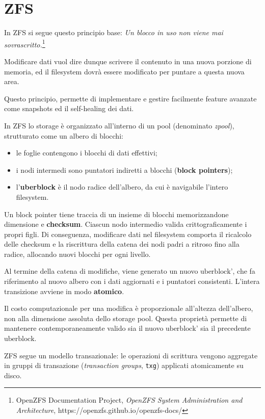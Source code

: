 \section{ZFS}\label{zfs}

In ZFS si segue questo principio base: \emph{Un blocco in uso non viene
mai sovrascritto.}\footnote{\label{fn:ref_29}OpenZFS Documentation Project, \emph{OpenZFS
  System Administration and Architecture},
  https://openzfs.github.io/openzfs-docs/}

Modificare dati vuol dire dunque scrivere il contenuto in una nuova
porzione di memoria, ed il filesystem dovrà essere modificato per
puntare a questa nuova area.

Questo principio, permette di implementare e gestire facilmente feature
avanzate come snapshots ed il self-healing dei dati.

In ZFS lo storage è organizzato all'interno di un pool (denominato
\emph{zpool}), strutturato come un albero di blocchi:

\begin{itemize}
\tightlist
\item
  le foglie contengono i blocchi di dati effettivi;
\item
  i nodi intermedi sono puntatori indiretti a blocchi (\textbf{block
  pointers});
\item
  l'\textbf{uberblock} è il nodo radice dell'albero, da cui è navigabile
  l'intero filesystem.
\end{itemize}

Un block pointer tiene traccia di un insieme di blocchi memorizzandone
dimensione e \textbf{checksum}. Ciascun nodo intermedio valida
crittograficamente i propri figli. Di conseguenza, modificare dati nel
filesystem comporta il ricalcolo delle checksum e la riscrittura della
catena dei nodi padri a ritroso fino alla radice, allocando nuovi
blocchi per ogni livello.

Al termine della catena di modifiche, viene generato un nuovo
\(\text{uberblock'}\), che fa riferimento al nuovo albero con i dati
aggiornati e i puntatori consistenti. L'intera transizione avviene in
modo \textbf{atomico}.

Il costo computazionale per una modifica è proporzionale all'altezza
dell'albero, non alla dimensione assoluta dello storage pool. Questa
proprietà permette di mantenere contemporaneamente valido sia il nuovo
\(\text{uberblock'}\) sia il precedente \(\text{uberblock}\).

ZFS segue un modello transazionale: le operazioni di scrittura vengono
aggregate in gruppi di transazione (\emph{transaction groups},
\passthrough{\lstinline!txg!}) applicati atomicamente su disco.

